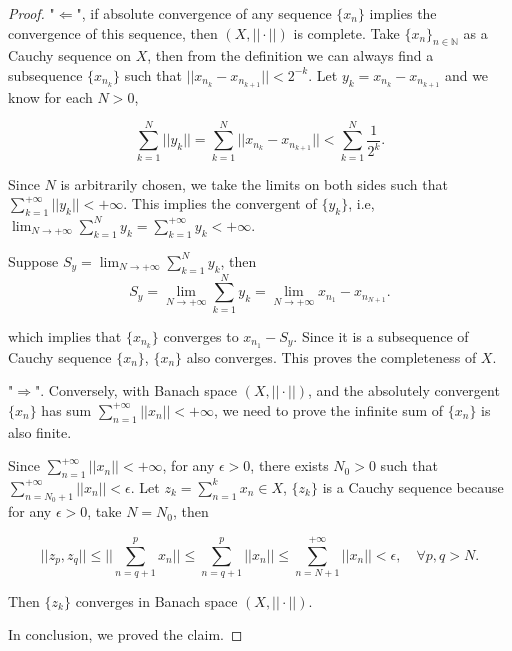 \documentclass[12pt]{article}
\begin{document}
\begin{proof}

"$\Leftarrow$", if absolute convergence of any sequence $\{x_n\}$ implies the convergence of this sequence, then $(X, ||\cdot||)$ is complete. Take $\{x_n\}_{n\in\mathbb N}$ as a Cauchy sequence on $X$, then from the definition we can always find a subsequence  $\{x_{n_k}\}$ such that $||x_{n_k} - x_{n_{k+1}}|| < 2^{-k}$. Let $y_k = x_{n_k} - x_{n_{k+1}}$ and we know for each $N>0$, 

$$
\sum_{k=1}^N ||y_k|| = \sum_{k=1}^N ||x_{n_k} - x_{n_{k+1}}|| <  \sum_{k=1}^N \frac{1}{2^k}.
$$

Since $N$ is arbitrarily chosen, we take the limits on both sides such that $\sum_{k=1}^{+\infty} ||y_k|| < +\infty$. This implies the convergent of $\{y_k\}$, i.e, $\lim_{N\rightarrow +\infty} \sum_{k=1}^N y_k = \sum_{k=1}^{+\infty} y_k < +\infty$.

Suppose $S_y = \lim_{N\rightarrow +\infty} \sum_{k=1}^N y_k$, then 
$$
S_y = \lim_{N\rightarrow +\infty} \sum_{k=1}^N y_k =\lim_{N\rightarrow +\infty} x_{n_1} - x_{n_{N+1}}.
$$

which implies that $\{x_{n_k}\}$ converges to $x_{n_1} - S_y$. Since it is a subsequence of Cauchy sequence $\{x_n\}$, $\{x_n\}$ also converges. This proves the completeness of $X$.

\vspace{15mm}

"$\Rightarrow$". Conversely, with Banach space $(X, ||\cdot||)$, and the absolutely convergent $\{x_n\}$ has sum $\sum_{n=1}^{+\infty} ||x_n|| < +\infty$, we need to prove the infinite sum of $\{x_n\}$ is also finite.

Since $\sum_{n=1}^{+\infty} ||x_n|| < +\infty$, for any $\epsilon > 0$, there exists $N_0>0$ such that $\sum_{n=N_0 + 1}^{+\infty} ||x_n|| < \epsilon$. Let $z_k = \sum_{n=1}^{k} x_n \in X$, $\{z_k\}$ is a Cauchy sequence because for any $\epsilon > 0$, take $N = N_0$, then

$$
||z_p, z_q|| \leqslant ||\sum_{n=q+1}^p x_n|| \leqslant \sum_{n=q+1}^p||x_n|| \leqslant \sum_{n=N+1}^{+\infty}||x_n|| < \epsilon, \quad \forall p, q > N.
$$

Then $\{z_k\}$ converges in Banach space $(X, ||\cdot||)$. 

In conclusion, we proved the claim.

\end{proof}


\vspace{60mm}
\end{document}
